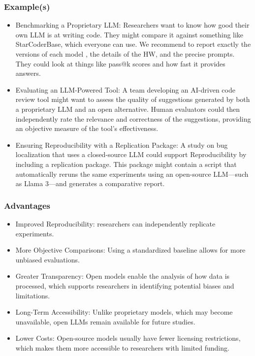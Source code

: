 \subsubsection{Example(s)}
\begin{itemize}
    \item Benchmarking a Proprietary LLM: Researchers want to know how good their own LLM is at writing code. They might compare it against something like StarCoderBase, which everyone can use. We recommend to report exactly the versions of each model , the details of the HW, and the precise prompts. They could look at things like pass@k scores and how fast it provides answers.
    \item Evaluating an LLM-Powered Tool: A team developing an AI-driven code review tool might want to assess the quality of suggestions generated by both a proprietary LLM and an open alternative. Human evaluators could then independently rate the relevance and correctness of the suggestions, providing an objective measure of the tool's effectiveness.
    \item Ensuring Reproducibility with a Replication Package: A study on bug localization that uses a closed-source LLM could support Reproducibility by including a replication package. This package might contain a script that automatically reruns the same experiments using an open-source LLM—such as Llama 3—and generates a comparative report.
\end{itemize}

\subsubsection{Advantages}
\begin{itemize}
    \item	Improved Reproducibility: researchers can independently replicate experiments.
    \item	More Objective Comparisons: Using a standardized baseline allows for more unbiased evaluations.
    \item	Greater Transparency: Open models enable the analysis of how data is processed, which supports researchers in identifying potential biases and limitations.
    \item	Long-Term Accessibility: Unlike proprietary models, which may become unavailable, open LLMs remain available for future studies.
    \item	Lower Costs: Open-source models usually have fewer licensing restrictions, which makes them more accessible to researchers with limited funding.
\end{itemize}


